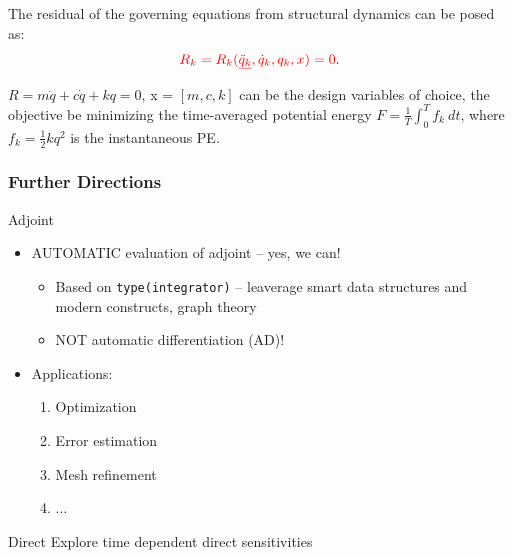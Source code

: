 \documentclass{beamer}
\begin{document}
\begin{frame}
{  The residual of the governing equations from structural dynamics
  can be posed as: 
  \begin{equation}\label{eqn:nbg-residual}
    \textcolor{red}{R_k = R_k(\underline{\ddot{q}_k}, \dot{q}_k, q_k, x) = 0}.
  \end{equation}
  \begin{example} 
    $R = m\ddot{q} + c\dot{q} + k{q} = 0$, x = $[m,
      c, k]$ can be the design variables of choice, the objective be
    minimizing the time-averaged potential energy $F = \frac{1}{T}
    \int_{0}^T f_k~dt$, where $f_k = \frac{1}{2} kq^2$ is the
    instantaneous PE.
  \end{example}
  }
\end{frame}

\begin{frame}
  \frametitle{Further Directions}

  \begin{block}{Adjoint}
    
    \begin{itemize}
    \item AUTOMATIC evaluation of adjoint -- yes, we can!
      \begin{itemize}
      \item Based on \texttt{type(integrator)} -- leaverage smart
        data structures and modern constructs, graph theory
      \item NOT automatic differentiation (AD)!
      \end{itemize}
      
    \item Applications:
      
      \begin{enumerate}
      \item Optimization
      \item Error estimation
      \item Mesh refinement
      \item $\ldots$
      \end{enumerate}
      
    \end{itemize}
    
  \end{block}

  \begin{block}{Direct}
    Explore time dependent direct sensitivities
  \end{block}  
\end{frame}
\end{document}
